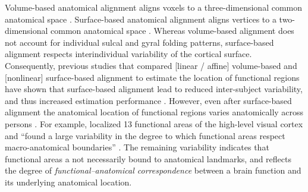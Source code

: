 Volume-based anatomical alignment \citep[s.][for a review]{klein2009evaluation}
aligns voxels to a three-dimensional common anatomical space \citep[e.g., MNI152
atlas;][]{fonov2011unbiased}.
Surface-based anatomical alignment \citep{fischl1999cortical, yeo2009spherical}
aligns vertices to a two-dimensional common anatomical space \citep[e.g.,
FreeSurfer's fsaverage template;][]{fischl1999high}.
Whereas volume-based alignment does not account for individual sulcal and gyral
folding patterns, surface-based alignment respects interindividual variability
of the cortical surface.
Consequently, previous studies that compared  [linear / affine] volume-based and
[nonlinear] surface-based alignment to estimate the location of functional
regions have shown that surface-based alignment lead to reduced inter-subject
variability, and thus increased estimation performance
\citep{rosenke2021probabilistic, frost2012measuring, wang2015probabilistic,
weiner2018defining}.
However, even after surface-based alignment the anatomical location of
functional regions varies anatomically across persons
\citep[e.g.,][]{coalson2018impact, benson2014correction, natu2021sulcal,
wang2015probabilistic, frost2012measuring, langers2014assessment, weiner2014mid,
rosenke2021probabilistic}.
For example, \citet{frost2012measuring} localized 13 functional areas of the
high-level visual cortex and ``found a large variability in the degree to which
functional areas respect macro-anatomical boundaries''
\citep{frost2012measuring}.
The remaining variability indicates that functional areas a not necessarily
bound to anatomical landmarks, and reflects the degree of
\textit{functional--anatomical correspondence} between a brain function and its
underlying anatomical location.


%
%



